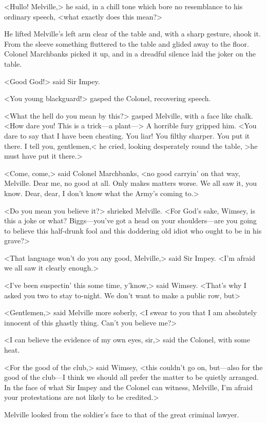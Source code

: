 <Hullo! Melville,> he said, in a chill tone which bore no resemblance to his ordinary speech, <what exactly does this mean?>

He lifted Melville's left arm clear of the table and, with a sharp gesture, shook it. From the sleeve something fluttered to the table and glided away to the floor. Colonel Marchbanks picked it up, and in a dreadful silence laid the joker on the table.

<Good God!> said Sir Impey.

<You young blackguard!> gasped the Colonel, recovering speech.

<What the hell do you mean by this?> gasped Melville, with a face like chalk. <How dare you! This is a trick—a plant—> A horrible fury gripped him. <You dare to say that I have been cheating. You liar! You filthy sharper. You put it there. I tell you, gentlemen,< he cried, looking desperately round the table, >he must have put it there.>

<Come, come,> said Colonel Marchbanks, <no good carryin' on that way, Melville. Dear me, no good at all. Only makes matters worse. We all saw it, you know. Dear, dear, I don't know what the Army's coming to.>

<Do you mean you believe it?> shrieked Melville. <For God's sake, Wimsey, is this a joke or what? Biggs—you've got a head on your shoulders—are you going to believe this half-drunk fool and this doddering old idiot who ought to be in his grave?>

<That language won't do you any good, Melville,> said Sir Impey. <I'm afraid we all saw it clearly enough.>

<I've been suspectin' this some time, y'know,> said Wimsey. <That's why I asked you two to stay to-night. We don't want to make a public row, but\longdash>

<Gentlemen,> said Melville more soberly, <I swear to you that I am absolutely innocent of this ghastly thing. Can't you believe me?>

<I can believe the evidence of my own eyes, sir,> said the Colonel, with some heat.

<For the good of the club,> said Wimsey, <this couldn't go on, but—also for the good of the club—I think we should all prefer the matter to be quietly arranged. In the face of what Sir Impey and the Colonel can witness, Melville, I'm afraid your protestations are not likely to be credited.>

Melville looked from the soldier's face to that of the great criminal lawyer.

